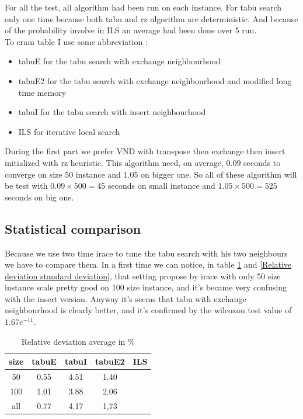 \documentclass[12pt,a4paper]{article}
\begin{document}
For all the test, all algorithm had been run on each instance. For tabu search only one time because both tabu and rz algorithm are deterministic. And because of the probability involve in ILS an average had been done over 5 run.\\
To cram table I use some abbreviation :
\begin{itemize}
\item
tabuE for the tabu search with exchange neighbourhood
\item
tabuE2 for the tabu search with exchange neighbourhood and modified long time memory
\item
tabuI for the tabu search with insert neighbourhood
\item
ILS for iterative local search
\end{itemize}
During the first part we prefer VND with transpose then exchange then insert initialized with rz heuristic. This algorithm need, on average, $0.09$ seconds to converge on size 50 instance and $1.05$ on bigger one. So all of these algorithm will be test with $0.09 \times 500 = 45$ seconds on small instance and $1.05 \times 500 = 525$ seconds on big one.

\subsection{Statistical comparison}

Because we use two time irace to tune the tabu search with his two neighbours we have to compare them. In a first time we can notice, in table \ref{Relative deviation average} and \ref{Relative deviation standard deviation}, that setting propose by irace with only 50 size instance scale pretty good on 100 size instance, and it's became very confusing with the insert version. Anyway it's seems that tabu with exchange neighbourhood is clearly better, and it's confirmed by the wilcoxon test value of $1.67 e^{-11}$.

\begin{table}[!h]
\centering
\begin{tabular}{|*{5}{c|}}
  \hline
  size & tabuE & tabuI & tabuE2 & ILS\\
  \hline
  50 & 0.55 & 4.51 & 1.40 &  \\ 
  100 & 1.01 & 3.88 & 2.06 &  \\
  all & 0.77 & 4.17 & 1,73 &  \\
  \hline
\end{tabular}
\caption{Relative deviation average in \%}
\label{Relative deviation average}
\end{table}
\end{document}
